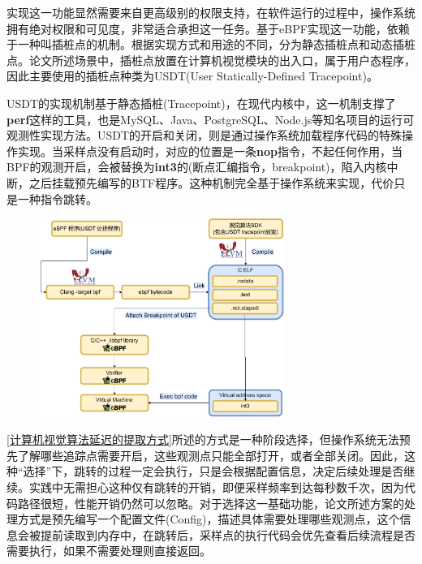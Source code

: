 \documentclass[master]{shtthesis}
\begin{document}
实现这一功能显然需要来自更高级别的权限支持，在软件运行的过程中，操作系统拥有绝对权限和可见度，非常适合承担这一任务。基于eBPF实现这一功能，依赖于一种叫插桩点的机制。根据实现方式和用途的不同，分为静态插桩点和动态插桩点。论文所述场景中，插桩点放置在计算机视觉模块的出入口，属于用户态程序，因此主要使用的插桩点种类为USDT(User Statically-Defined Tracepoint)。

USDT的实现机制基于静态插桩(Tracepoint)，在现代内核中，这一机制支撑了\textbf{perf}\cite{de2010new}这样的工具，也是MySQL、Java、PostgreSQL、Node.js等知名项目的运行可观测性实现方法。USDT的开启和关闭，则是通过操作系统加载程序代码的特殊操作实现。当采样点没有启动时，对应的位置是一条\textbf{nop}指令，不起任何作用，当BPF的观测开启，会被替换为\textbf{int3}的(断点汇编指令，breakpoint)，陷入内核中断，之后挂载预先编写的BTF程序。这种机制完全基于操作系统来实现，代价只是一种指令跳转。
\begin{figure}[htbp]
	\centering
	\includegraphics[width=8cm]{img/usdt.pdf}
	\label{使用USDT构造视觉算法运行时采样点}
\end{figure}

\ref{计算机视觉算法延迟的提取方式}所述的方式是一种阶段选择，但操作系统无法预先了解哪些追踪点需要开启，这些观测点只能全部打开，或者全部关闭。因此，这种“选择”下，跳转的过程一定会执行，只是会根据配置信息，决定后续处理是否继续。实践中无需担心这种仅有跳转的开销，即便采样频率到达每秒数千次，因为代码路径很短，性能开销仍然可以忽略。对于选择这一基础功能，论文所述方案的处理方式是预先编写一个配置文件(Config)，描述具体需要处理哪些观测点，这个信息会被提前读取到内存中，在跳转后，采样点的执行代码会优先查看后续流程是否需要执行，如果不需要处理则直接返回。
\end{document}
